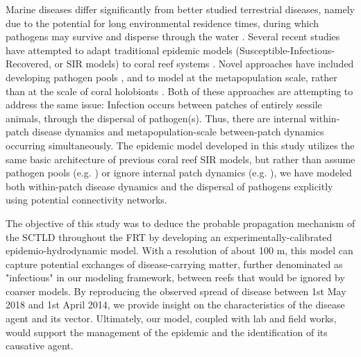 \documentclass[utf8]{frontiersSCNS}
\begin{document}
Marine diseases differ significantly from better studied terrestrial diseases, namely due to the potential for long environmental residence times, during which pathogens may survive and disperse through the water \citep{harvell2007coral, sokolow2009effects}. Several recent studies have attempted to adapt traditional epidemic models (Susceptible-Infectious-Recovered, or SIR models) to coral reef systems \citep{sokolow2009effects, bidegain2016microparasitic, bidegain2016marine}. Novel approaches have included developing pathogen pools \citep{bidegain2016microparasitic, bidegain2016marine}, and to model at the metapopulation scale, rather than at the scale of coral holobionts \citep{sokolow2009effects}. Both of these approaches are attempting to address the same issue: Infection occurs between patches of entirely sessile animals, through the dispersal of pathogen(s). Thus, there are internal within-patch disease dynamics and metapopulation-scale between-patch dynamics occurring simultaneously. The epidemic model developed in this study utilizes the same basic architecture of previous coral reef SIR models, but rather than assume pathogen pools (e.g. \cite{bidegain2016microparasitic, bidegain2016marine}) or ignore internal patch dynamics (e.g. \cite{sokolow2009effects}), we have modeled both within-patch disease dynamics and the dispersal of pathogens explicitly using potential connectivity networks.

The objective of this study was to deduce the probable propagation mechanism of the SCTLD throughout the FRT by developing an experimentally-calibrated epidemio-hydrodynamic model. With a resolution of about 100 m, this model can capture potential exchanges of disease-carrying matter, further denominated as "infectious" in our modeling framework, between reefs that would be ignored by coarser models. By reproducing the observed spread of disease between 1st May 2018 and 1st April 2014, we provide insight on the characteristics of the disease agent and its vector. Ultimately, our model, coupled with lab and field works, would support the management of the epidemic and the identification of its causative agent.
\end{document}
